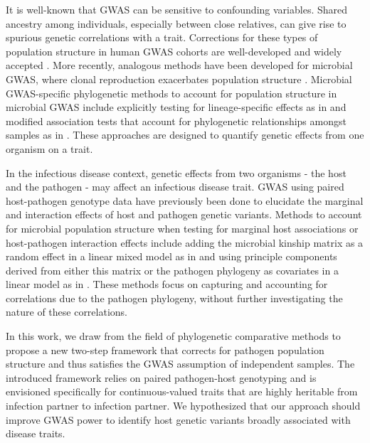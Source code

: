 \documentclass[11pt]{article}
\begin{document}
\begin{linenumbers}
It is well-known that GWAS can be sensitive to confounding variables. Shared ancestry among individuals, especially between close relatives, can give rise to spurious genetic correlations with a trait. Corrections for these types of population structure in human GWAS cohorts are well-developed and widely accepted  \citep{Astle2009, Price2006}. More recently, analogous methods have been developed for microbial GWAS, where clonal reproduction exacerbates population structure \citep{Power2017}. Microbial GWAS-specific phylogenetic methods to account for population structure in microbial GWAS include explicitly testing for lineage-specific effects as in \cite{Earle2016} and modified association tests that account for phylogenetic relationships amongst samples as in \cite{collins_phylogenetic_nodate}. These approaches are designed to quantify genetic effects from one organism on a trait. 

In the infectious disease context, genetic effects from two organisms - the host and the pathogen - may affect an infectious disease trait. GWAS using paired host-pathogen genotype data have previously been done to elucidate the marginal and interaction effects of host and pathogen genetic variants. Methods to account for microbial population structure when testing for marginal host associations or host-pathogen interaction effects include adding the microbial kinship matrix as a random effect in a linear mixed model as in \cite{Wang2018Two-wayGenomes} and using principle components derived from either this matrix or the pathogen phylogeny as covariates in a linear model as in \cite{Naret2018}. These methods focus on capturing and accounting for correlations due to the pathogen phylogeny, without further investigating the nature of these correlations.

In this work, we draw from the field of phylogenetic comparative methods to propose a new two-step framework that corrects for pathogen population structure and thus satisfies the GWAS assumption of independent samples. 
The introduced framework relies on paired pathogen-host genotyping and is envisioned specifically for continuous-valued traits that are highly heritable from infection partner to infection partner.
We hypothesized that our approach should improve GWAS power to identify host genetic variants broadly associated with disease traits.


\end{linenumbers}
\end{document}
